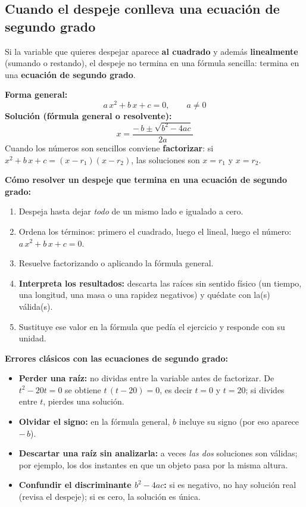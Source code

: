 \documentclass[12pt, letterpaper]{article}
\begin{document}
\subsection{Cuando el despeje conlleva una ecuación de segundo grado}

\begin{cuadroteoria}
  Si la variable que quieres despejar aparece \textbf{al cuadrado} y además \textbf{linealmente} (sumando o restando), el despeje no termina en una fórmula sencilla: termina en una \textbf{ecuación de segundo grado}.

  \textbf{Forma general:}
  $$a\,x^2 + b\,x + c = 0, \qquad a \neq 0$$
  \textbf{Solución (fórmula general o resolvente):}
  $$x = \frac{-\,b \pm \sqrt{b^2 - 4ac}}{2a}$$
  Cuando los números son sencillos conviene \textbf{factorizar}: si $x^2 + b\,x + c = (x - r_1)(x - r_2)$, las soluciones son $x = r_1$ y $x = r_2$.
\end{cuadroteoria}

\begin{cuadropasos}
  \textbf{Cómo resolver un despeje que termina en una ecuación de segundo grado:}
  \begin{enumerate}[leftmargin=*]
    \item Despeja hasta dejar \emph{todo} de un mismo lado e igualado a cero.
    \item Ordena los términos: primero el cuadrado, luego el lineal, luego el número: $a\,x^2 + b\,x + c = 0$.
    \item Resuelve factorizando o aplicando la fórmula general.
    \item \textbf{Interpreta los resultados:} descarta las raíces sin sentido físico (un tiempo, una longitud, una masa o una rapidez negativos) y quédate con la(s) válida(s).
    \item Sustituye ese valor en la fórmula que pedía el ejercicio y responde con su unidad.
  \end{enumerate}
\end{cuadropasos}

\begin{cuadroadvertencia}
  \textbf{Errores clásicos con las ecuaciones de segundo grado:}
  \begin{itemize}[leftmargin=*]
    \item \textbf{Perder una raíz:} no dividas entre la variable antes de factorizar. De $t^2 - 20t = 0$ se obtiene $t\,(t - 20) = 0$, es decir $t = 0$ y $t = 20$; si divides entre $t$, pierdes una solución.
    \item \textbf{Olvidar el signo:} en la fórmula general, $b$ incluye su signo (por eso aparece $-\,b$).
    \item \textbf{Descartar una raíz sin analizarla:} a veces \emph{las dos} soluciones son válidas; por ejemplo, los dos instantes en que un objeto pasa por la misma altura.
    \item \textbf{Confundir el discriminante $b^2 - 4ac$:} si es negativo, no hay solución real (revisa el despeje); si es cero, la solución es única.
  \end{itemize}
\end{cuadroadvertencia}
\end{document}
